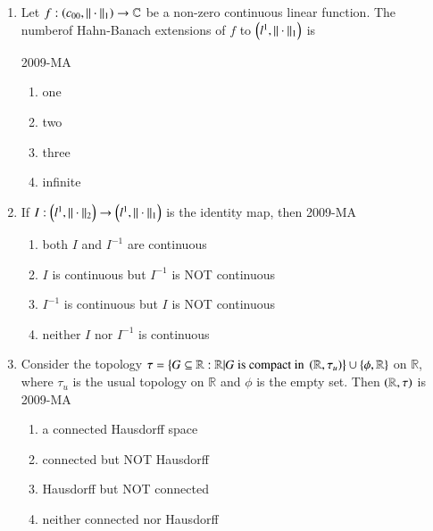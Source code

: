 \documentclass[journal,12pt,onecolumn]{IEEEtran}
\theoremstyle{remark}
\begin{document}
\begin{enumerate}
	\item Let $f : \left(c_{00}, ||\cdot||_{1}\right) \to \mathbb{C}$ be a non-zero continuous linear function. The numberof Hahn-Banach extensions of $f$ to $\left(l^{1}, || \cdot ||_{1}\right)$ is

\hfill{2009-MA}
	\begin{multicols}{2}
	\begin{enumerate}
		\item one
		\item two
		\item three
		\item infinite
	\end{enumerate}
	\end{multicols}

	\item If $I : \left(l^{1}, || \cdot ||_{2}\right) \to \left(l^{1}, || \cdot ||_{1}\right)$ is the identity map, then
\hfill{2009-MA}
	\begin{enumerate}
		\item both $I$ and $I^{-1}$ are continuous
		\item $I$ is continuous but $I^{-1}$ is NOT continuous
		\item $I^{-1}$ is continuous but $I$ is NOT continuous
		\item neither $I$ nor $I^{-1}$ is continuous
	\end{enumerate}

\item Consider the topology $\tau = \left\{G \subseteq \mathbb{R} : \mathbb{R} | G \text{ is compact in } \left(\mathbb{R}, \tau _{u}\right)\right\} \cup \left\{\phi, \mathbb{R}\right\}$ on $\mathbb{R}$, where $\tau_{u}$ is the usual topology on $\mathbb{R}$ and $\phi$ is the empty set. Then $\left(\mathbb{R}, \tau\right)$ is
\hfill{2009-MA}
	\begin{enumerate}
		\item  a connected Hausdorff space
		\item connected but NOT Hausdorff
		\item Hausdorff but NOT connected
		\item neither connected nor Hausdorff
	\end{enumerate}


\end{enumerate}
\end{document}
